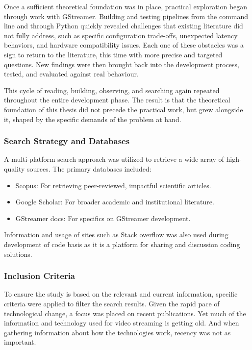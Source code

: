 Once a sufficient theoretical foundation was in place, practical exploration began through work with GStreamer. Building and testing pipelines from the command line and through Python quickly revealed challenges that existing literature did not fully address, such as specific configuration trade-offs, unexpected latency behaviors, and hardware compatibility issues. Each one of these obstacles was a sign to return to the literature, this time with more precise and targeted questions. New findings were then brought back into the development process, tested, and evaluated against real behaviour.

This cycle of reading, building, observing, and searching again repeated throughout the entire development phase. The result is that the theoretical foundation of this thesis did not precede the practical work, but grew alongside it, shaped by the specific demands of the problem at hand.



\subsubsection{Search Strategy and Databases}
A multi-platform search approach was utilized to retrieve a wide array of high-quality sources. The primary databases included:

\begin{itemize}
    \item Scopus: For retrieving peer-reviewed, impactful scientific articles.
    \item Google Scholar: For broader academic and institutional literature.
    \item GStreamer docs: For specifics on GStreamer development.
\end{itemize}

Information and usage of sites such as Stack overflow was also used during development of code basis as it is a platform for sharing and discussion coding solutions.

\subsubsection{Inclusion Criteria}
To ensure the study is based on the relevant and current information, specific criteria were applied to filter the search results. Given the rapid pace of technological change, a focus was placed on recent publications. Yet much of the information and technology used for video streaming is getting old. And when gathering information about how the technologies work, recency was not as important.

